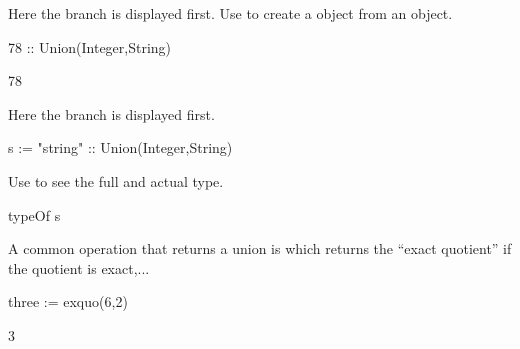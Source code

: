 \begin{xtc}
\begin{xtccomment}
Here the  branch is displayed first.
Use \spadSyntax{::} to create a  object from an object.
\end{xtccomment}
\begin{spadsrc}
78 :: Union(Integer,String)
\end{spadsrc}
\begin{TeXOutput}
\begin{fricasmath}{5}
78%
\end{fricasmath}
\end{TeXOutput}
\end{xtc}
\begin{xtc}
\begin{xtccomment}
Here the  branch is displayed first.
\end{xtccomment}
\begin{spadsrc}
s := "string" :: Union(Integer,String) 
\end{spadsrc}
\begin{TeXOutput}
\begin{fricasmath}{6}
%
\end{fricasmath}
\end{TeXOutput}
\end{xtc}
\begin{xtc}
\begin{xtccomment}
Use  to see the full and actual  type.
\end{xtccomment}
\begin{spadsrc}
typeOf s
\end{spadsrc}
\begin{TeXOutput}
\begin{fricasmath}{7}
%
\end{fricasmath}
\end{TeXOutput}
\end{xtc}
\begin{xtc}
\begin{xtccomment}
A common operation that returns a union is 
which returns the ``exact quotient'' if the quotient is exact,...
\end{xtccomment}
\begin{spadsrc}
three := exquo(6,2) 
\end{spadsrc}
\begin{TeXOutput}
\begin{fricasmath}{8}
3%
\end{fricasmath}
\end{TeXOutput}
\end{xtc}
